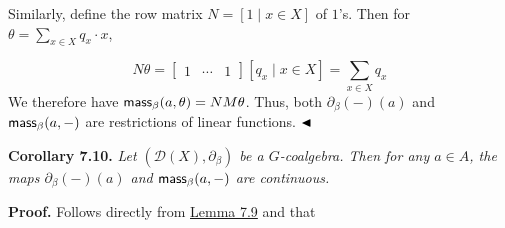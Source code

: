 \documentclass[11pt,a4paper]{amsart}
\begin{document}
\hypertarget{html:S7.SS0.SSS0.P0.SPx5.p2}{} Similarly, define the row matrix %
\hypertarget{html:S7.SS0.SSS0.P0.SPx5.p2.m1}{}\({N=[1\mid x\in X]}\) of %
\hypertarget{html:S7.SS0.SSS0.P0.SPx5.p2.m2}{}\({1}\)’s. Then for %
\hypertarget{html:S7.SS0.SSS0.P0.SPx5.p2.m3}{}\({\theta=\sum_{x\in X}q_{x}\cdot x}\),
\par\medskip
\hypertarget{html:S7.Ex6}{}   %
\hypertarget{html:S7.Ex6.m1}{}\[N\theta=\begin{bmatrix}1&\cdots&1\end{bmatrix}[q_{x}\mid x\in X]=\sum_{x\in X}q_{x}\]    We therefore have %
\hypertarget{html:S7.SS0.SSS0.P0.SPx5.p2.m4}{}\({\mbox{\sf mass}_{\beta}(a,\theta)=NM\theta}\). Thus, both %
\hypertarget{html:S7.SS0.SSS0.P0.SPx5.p2.m5}{}\({\partial_{\beta}(-)(a)}\) and %
\hypertarget{html:S7.SS0.SSS0.P0.SPx5.p2.m6}{}\({\mbox{\sf mass}_{\beta}(a,-)}\) are restrictions of linear functions. %
\hypertarget{html:S7.SS0.SSS0.P0.SPx5.p2.m7}{}\({\hfill\blacktriangleleft}\)
\par\medskip
\hypertarget{html:S7.Thmtheorem10}{} \par\noindent\textbf{\textbf{Corollary 7.10}\textbf{.}}\quad  %
\hypertarget{html:S7.Thmtheorem10.p1}{} \emph{Let %
\hypertarget{html:S7.Thmtheorem10.p1.m1}{}\({({\mathcal{D}}(X),\partial_{\beta})}\) be a %
\hypertarget{html:S7.Thmtheorem10.p1.m2}{}\({G}\)-coalgebra. Then for any %
\hypertarget{html:S7.Thmtheorem10.p1.m3}{}\({a\in A}\), the maps %
\hypertarget{html:S7.Thmtheorem10.p1.m4}{}\({\partial_{\beta}(-)(a)}\) and %
\hypertarget{html:S7.Thmtheorem10.p1.m5}{}\({\mbox{\sf mass}_{\beta}(a,-)}\) are continuous.}
\par\medskip
\hypertarget{html:S7.SS0.SSS0.P0.SPx6}{} \par\noindent\textbf{Proof.}\quad  %
\hypertarget{html:S7.SS0.SSS0.P0.SPx6.p1}{} Follows directly from \hyperlink{html:S7.Thmtheorem9}{Lemma 7.9} and that %
\end{document}
